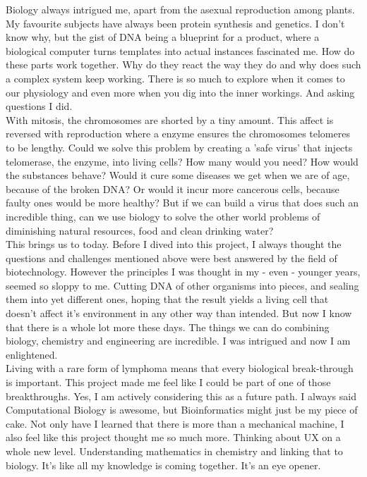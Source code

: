 Biology always intrigued me, apart from the asexual reproduction among plants. My favourite subjects have always been protein synthesis and genetics. I don't know why, but the gist of DNA being a blueprint for a product, where a biological computer turns templates into actual instances fascinated me. How do these parts work together. Why do they react the way they do and why does such a complex system keep working. There is so much to explore when it comes to our physiology and even more when you dig into the inner workings. And asking questions I did.\\

With mitosis, the chromosomes are shorted by a tiny amount. This affect is reversed with reproduction where a enzyme ensures the chromosomes telomeres to be lengthy. Could we solve this problem by creating a 'safe virus' that injects telomerase, the enzyme, into living cells? How many would you need? How would the substances behave? Would it cure some diseases we get when we are of age, because of the broken DNA? Or would it incur more cancerous cells, because faulty ones would be more healthy? But if we can build a virus that does such an incredible thing, can we use biology to solve the other world problems of diminishing natural resources, food and clean drinking water? \\

This brings us to today. Before I dived into this project, I always thought the questions and challenges mentioned above were best answered by the field of biotechnology. However the principles I was thought in my - even - younger years, seemed so sloppy to me. Cutting DNA of other organisms into pieces, and sealing them into yet different ones, hoping that the result yields a living cell that doesn't affect it's environment in any other way than intended. But now I know that there is a whole lot more these days. The things we can do combining biology, chemistry and engineering are incredible. I was intrigued and now I am enlightened. \\

Living with a rare form of lymphoma means that every biological break-through is important. This project made me feel like I could be part of one of those breakthroughs. Yes, I am actively considering this as a future path. I always said Computational Biology is awesome, but Bioinformatics might just be my piece of cake. Not only have I learned that there is more than a mechanical machine, I also feel like this project thought me so much more. Thinking about UX on a whole new level. Understanding mathematics in chemistry and linking that to biology. It's like all my knowledge is coming together. It's an eye opener.\\

